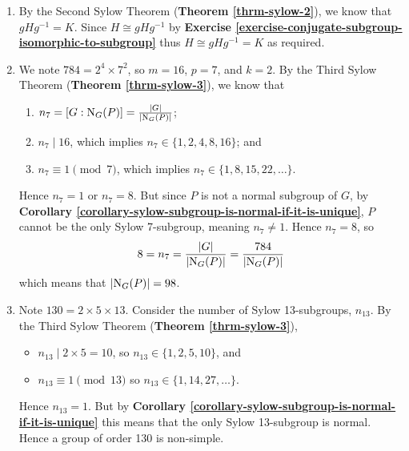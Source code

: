\begin{enumerate}
    \item By the Second Sylow Theorem (\textbf{Theorem \ref{thrm-sylow-2}}), we know that $gHg^{-1} = K$. Since $H \cong gHg^{-1}$ by \textbf{Exercise \ref{exercise-conjugate-subgroup-isomorphic-to-subgroup}} thus $H \cong gHg^{-1} = K$ as required.

    \item We note $784 = 2^4 \times 7^2$, so $m = 16$, $p = 7$, and $k = 2$. By the Third Sylow Theorem (\textbf{Theorem \ref{thrm-sylow-3}}), we know that
    \begin{enumerate}
        \item $n_7 = [G : \mathrm{N}_{G}(P)] = \frac{|G|}{|\mathrm{N}_{G}(P)|}$;
        \item $n_7 \mid 16$, which implies $n_7 \in \{1, 2, 4, 8, 16\}$; and
        \item $n_7 \equiv 1 \pmod 7$, which implies $n_7 \in \{1, 8, 15, 22, \dots\}$.
    \end{enumerate}
    Hence $n_7 = 1$ or $n_7 = 8$. But since $P$ is not a normal subgroup of $G$, by \textbf{Corollary \ref{corollary-sylow-subgroup-is-normal-if-it-is-unique}}, $P$ cannot be the only Sylow 7-subgroup, meaning $n_7 \neq 1$. Hence $n_7 = 8$, so
    \[
        8 = n_7 = \frac{|G|}{|\mathrm{N}_{G}(P)|} = \frac{784}{|\mathrm{N}_{G}(P)|}
    \]
    which means that $|\mathrm{N}_{G}(P)| = 98$.

    \item Note $130 = 2 \times 5 \times 13$. Consider the number of Sylow 13-subgroups, $n_13$. By the Third Sylow Theorem (\textbf{Theorem \ref{thrm-sylow-3}}),
    \begin{itemize}
        \item $n_13 \mid 2 \times 5 = 10$, so $n_13 \in \{1, 2, 5, 10\}$, and
        \item $n_13 \equiv 1 \pmod{13}$ so $n_13 \in \{1, 14, 27, \dots\}$.
    \end{itemize}
    Hence $n_13 = 1$. But by \textbf{Corollary \ref{corollary-sylow-subgroup-is-normal-if-it-is-unique}} this means that the only Sylow 13-subgroup is normal. Hence a group of order 130 is non-simple.
\end{enumerate}

